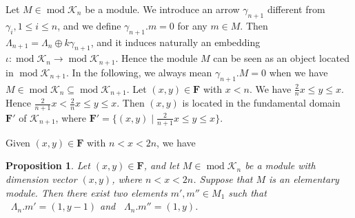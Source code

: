 \documentclass[a4paper,12pt]{amsart}
\newcommand{\cK}{\mathcal{K}}
\DeclareMathOperator{\modd}{mod}
\DeclareMathOperator{\dimu}{\underline{dim}}
\newtheorem{proposition}{Proposition}[section]
\begin{document}
Let $ M \in  \modd\cK_n $ be a module. We introduce an arrow $ \gamma_{n+1} $ different from $ \gamma_i, 1 \leq i \leq n $, and we define $ \gamma_{n+1}.m = 0 $ for any $ m \in M $. Then $ \Lambda_{n+1} = \Lambda_n \oplus k \gamma_{n+1} $, and it induces naturally an embedding $ \iota : \modd\mathcal{K}_n \to \modd \mathcal{K}_{n+1} $. Hence the module $ M $ can be seen as an object located in $ \modd \mathcal{K}_{n+1} $. In the following, we always mean $ \gamma_{n+1}.M = 0 $ when we have $ M \in \modd \mathcal{K}_n \subseteq \modd  \mathcal{K}_{n+1} $. Let $ (x,y) \in \mathbf{F} $ with $ x < n $. We have $ \frac{2}{n} x \leq y \leq x $. Hence $ \frac{2}{n+1} x < \frac{2}{n} x \leq y \leq x $. Then $ (x,y) $ is located in the fundamental domain $ \mathbf{F}' $ of $ \mathcal{K}_{n+1} $, where $ \mathbf{F}' = \{(x,y) \mid \frac{2}{n+1} x \leq y \leq x\} $.


 Given  $(x,y)\in \mathbf{F}$ with $n<x<2n$,  we have

\begin{proposition}\label{N}
Let $(x,y)\in \mathbf{F}$, and let $M\in\modd \cK_n$ be a module with dimension vector $(x,y)$, where $n<x<2n$. Suppose that $M$ is an elementary module.  Then  there exist two elements  $ m', m''\in M_1$ such that  $\dimu \Lambda_n.m'=(1,y-1)$ and $\dimu \Lambda_n.m''=(1,y)$.
\end{proposition}
\end{document}

